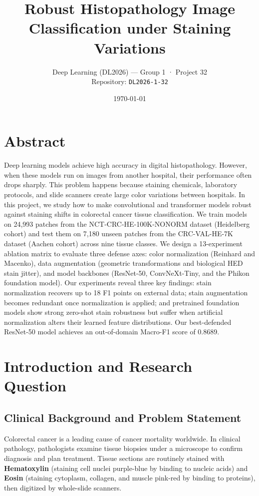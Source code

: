 \documentclass[11pt,a4paper]{article}
\title{\textbf{Robust Histopathology Image Classification under Staining Variations}}
\author{Deep Learning (DL2026) --- Group 1 · Project 32\\[2pt]
        Repository: \texttt{DL2026-1-32}}
\date{\today}
\begin{document}
\maketitle
\vspace{-1.2em}

\section{Abstract}
Deep learning models achieve high accuracy in digital histopathology. However, when
these models run on images from another hospital, their performance often drops
sharply. This problem happens because staining chemicals, laboratory protocols, and
slide scanners create large color variations between hospitals. In this project, we
study how to make convolutional and transformer models robust against staining shifts
in colorectal cancer tissue classification. We train models on 24{,}993 patches from
the NCT-CRC-HE-100K-NONORM dataset (Heidelberg cohort) and test them on 7{,}180 unseen
patches from the CRC-VAL-HE-7K dataset (Aachen cohort) across nine tissue classes. We
design a 13-experiment ablation matrix to evaluate three defense axes: color
normalization (Reinhard and Macenko), data augmentation (geometric transformations and
biological HED stain jitter), and model backbones (ResNet-50, ConvNeXt-Tiny, and the
Phikon foundation model). Our experiments reveal three key findings: stain
normalization recovers up to 18 F1 points on external data; stain augmentation becomes
redundant once normalization is applied; and pretrained foundation models show strong
zero-shot stain robustness but suffer when artificial normalization alters their
learned feature distributions. Our best-defended ResNet-50 model achieves an
out-of-domain Macro-F1 score of 0.8689.

\section{Introduction and Research Question}

\subsection{Clinical Background and Problem Statement}
Colorectal cancer is a leading cause of cancer mortality worldwide. In clinical pathology, pathologists examine tissue biopsies under a microscope to confirm diagnosis and plan treatment. Tissue sections are routinely stained with \textbf{Hematoxylin} (staining cell nuclei purple-blue by binding to nucleic acids) and \textbf{Eosin} (staining cytoplasm, collagen, and muscle pink-red by binding to proteins), then digitized by whole-slide scanners.
\end{document}
